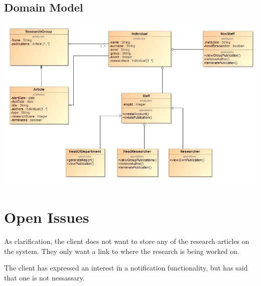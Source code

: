 \documentclass[a4paper,12pt]{article}
\begin{document}
\subsection{Domain Model}
	\includegraphics[width=1\textwidth]{./Domain.jpg}\\[1.5cm]
\newpage
\section{Open Issues}
As clarification, the client does not want to store any of the research articles on the system. They only want a link to where the research is being worked on.

The client has expressed an interest in a notification functionality, but has said that one is not nessassary.
\end{document}
